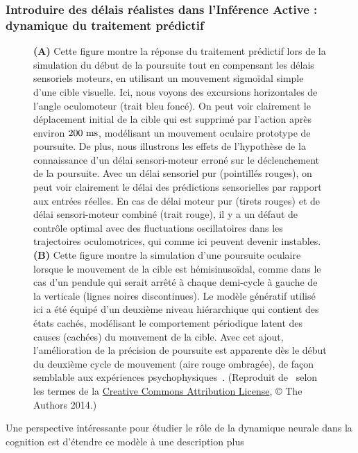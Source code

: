 \subsubsection{Introduire des délais réalistes dans l'Inférence Active : dynamique du
traitement prédictif}
\begin{figure}%
\caption{\textbf{(A)} Cette figure montre la réponse du traitement
prédictif lors de la simulation du début de la poursuite tout en
compensant les délais sensoriels moteurs, en utilisant un mouvement sigmoïdal simple
d'une cible visuelle. Ici, nous voyons des excursions horizontales de
l'angle oculomoteur (trait bleu foncé). On peut voir clairement le
déplacement initial de la cible qui est supprimé par l'action après
environ $200~\si{\milli\second}$, modélisant un mouvement oculaire prototype de poursuite.
De plus, nous illustrons les effets de l'hypothèse de la connaissance d'un délai
sensori-moteur erroné sur le déclenchement de la poursuite. Avec
un délai sensoriel pur (pointillés rouges), on peut voir
clairement le délai des prédictions sensorielles par rapport aux
entrées réelles. En cas de délai moteur pur (tirets rouges) et de délai sensori-moteur combiné (trait rouge), il y a un
défaut de contrôle optimal avec des fluctuations oscillatoires dans les
trajectoires oculomotrices, qui comme ici peuvent devenir instables. \textbf{(B)}
Cette figure montre la simulation d'une poursuite oculaire lorsque le
mouvement de la cible est hémisinusoïdal, comme dans le cas d'un pendule
qui serait arrêté à chaque demi-cycle à gauche de la verticale (lignes
noires discontinues). Le modèle génératif utilisé ici a été équipé d'un
deuxième niveau hiérarchique qui contient des états cachés, modélisant
le comportement périodique latent des causes (cachées) du mouvement de
la cible. Avec cet ajout, l'amélioration de la précision de poursuite
est apparente dès le début du deuxième cycle de mouvement (aire
rouge ombragée), de façon semblable aux expériences psychophysiques~\citep{Barnes91}. (Reproduit de~\citep{PerrinetAdamsFriston14} selon
les termes de la
\href{https://link.springer.com/article/10.1007/s00422-014-0620-8\#copyrightInformation}{Creative
Commons Attribution License}, © The Authors 2014.)
}
\label{fig:PerrinetAdamsFriston14}
\end{figure}
Une perspective intéressante pour étudier le rôle de la dynamique
neurale dans la cognition est d'étendre ce modèle à une description plus
